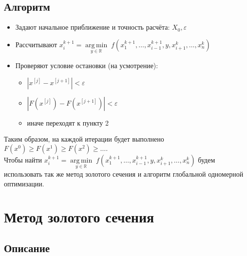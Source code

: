 \documentclass{article}
\begin{document}
    \subsection{Алгоритм}
    \begin{itemize}
        \item Задают начальное приближение и точность расчёта: $X_0, \varepsilon$
        \item Рассчитывают ${\displaystyle x_{i}^{k+1}={\underset {y\in \mathbb {R} }{\operatorname {arg\,min} }}\;f(x_{1}^{k+1},\dots ,x_{i-1}^{k+1},y,x_{i+1}^{k},\dots ,x_{n}^{k})}$
        \item Проверяют условие остановки (на усмотрение):
        \begin{itemize}
            \item $|x^{[j]}-x^{[j+1]}|<\varepsilon$
            \item $|F(x^{[j]})-F(x^{[j+1]})|<\varepsilon$
            \item иначе переходят к пункту 2
        \end{itemize}
    \end{itemize}

    Таким образом, на каждой итерации будет выполнено
    ${\displaystyle F({x} ^{0})\geqslant F({x} ^{1})\geqslant F({x} ^{2})\geqslant \dots .}$\\

    Чтобы найти ${\displaystyle x_{i}^{k+1}={\underset {y\in \mathbb {R} }{\operatorname {arg\,min} }}\;f(x_{1}^{k+1},\dots ,x_{i-1}^{k+1},y,x_{i+1}^{k},\dots ,x_{n}^{k})}$ будем использовать так же метод золотого сечения и алгоритм глобальной одномерной оптимизации.













    \newpage


    \section{Метод золотого сечения}

    \subsection{Описание}
\end{document}
